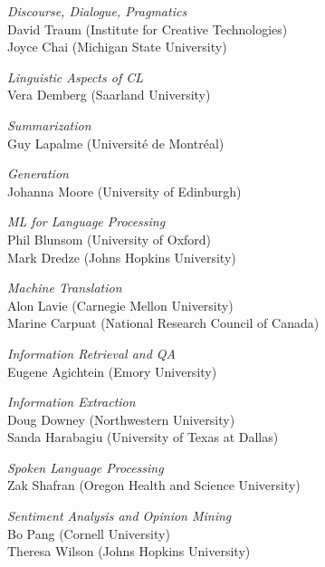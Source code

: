 \emph{Discourse, Dialogue, Pragmatics}	\\
David Traum (Institute for Creative Technologies) \\
Joyce Chai (Michigan State University) \\

\emph{Linguistic Aspects of CL} \\
Vera Demberg (Saarland University) \\

\emph{Summarization} \\
Guy Lapalme (Université de Montréal) \\

\emph{Generation} \\
Johanna Moore (University of Edinburgh) \\

\emph{ML for Language Processing} \\
Phil Blunsom (University of Oxford) \\
Mark Dredze (Johns Hopkins University) \\

\emph{Machine Translation} \\
Alon Lavie (Carnegie Mellon University) \\
Marine Carpuat (National Research Council of Canada) \\

\emph{Information Retrieval and QA} \\
Eugene Agichtein (Emory University) \\

\emph{Information Extraction} \\
Doug Downey (Northwestern University) \\
Sanda Harabagiu (University of Texas at Dallas) \\

\emph{Spoken Language Processing} \\
Zak Shafran (Oregon Health and Science University) \\

\emph{Sentiment Analysis and Opinion Mining} \\
Bo Pang (Cornell University) \\
Theresa Wilson (Johns Hopkins University) \\

